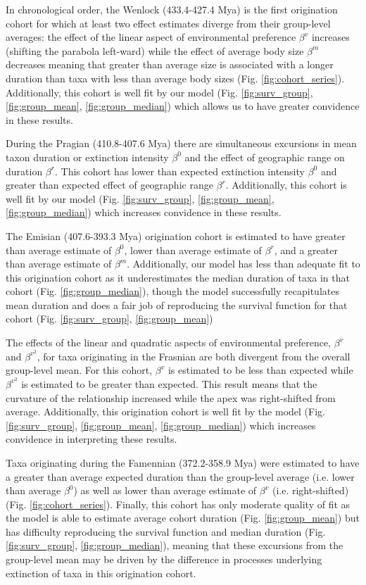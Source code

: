 \documentclass[11pt]{article}
\begin{document}
In chronological order, the Wenlock (433.4-427.4 Mya) is the first origination cohort for which at least two effect estimates diverge from their group-level averages: the effect of the linear aspect of environmental preference \(\beta^{v}\) increases (shifting the parabola left-ward) while the effect of average body size \(\beta^{m}\) decreases meaning that greater than average size is associated with a longer duration than taxa with less than average body sizes (Fig. \ref{fig:cohort_series}). Additionally, this cohort is well fit by our model (Fig. \ref{fig:surv_group}, \ref{fig:group_mean}, \ref{fig:group_median}) which allows us to have greater convidence in these results.

During the Pragian (410.8-407.6 Mya) there are simultaneous excursions in mean taxon duration or extinction intensity \(\beta^{0}\) and the effect of geographic range on duration \(\beta^{r}\). This cohort has lower than expected extinction intensity \(\beta^{0}\) and greater than expected effect of geographic range \(\beta^{r}\). Additionally, this cohort is well fit by our model (Fig. \ref{fig:surv_group}, \ref{fig:group_mean}, \ref{fig:group_median}) which increases convidence in these results.

The Emisian (407.6-393.3 Mya) origination cohort is estimated to have greater than average estimate of \(\beta^{0}\), lower than average estimate of \(\beta^{r}\), and a greater than average estimate of \(\beta^{m}\). Additionally, our model has less than adequate fit to this origination cohort as it underestimates the median duration of taxa in that cohort (Fig. \ref{fig:group_median}), though the model successfully recapitulates mean duration and does a fair job of reproducing the survival function for that cohort (Fig. \ref{fig:surv_group}, \ref{fig:group_mean})


The effects of the linear and quadratic aspects of environmental preference, \(\beta^{v}\) and \(\beta^{v^{2}}\), for taxa originating in the Frasnian are both divergent from the overall group-level mean. For this cohort, \(\beta^{v}\) is estimated to be less than expected while \(\beta^{v^{2}}\) is estimated to be greater than expected. This result means that the curvature of the relationship increased while the apex was right-shifted from average. Additionally, this origination cohort is well fit by the model (Fig. \ref{fig:surv_group}, \ref{fig:group_mean}, \ref{fig:group_median}) which increases convidence in interpreting these results.

Taxa originating during the Famennian (372.2-358.9 Mya) were estimated to have a greater than average expected duration than the group-level average (i.e. lower than average \(\beta^{0}\)) as well as lower than average estimate of \(\beta^{v}\) (i.e. right-shifted) (Fig. \ref{fig:cohort_series}). Finally, this cohort has only moderate quality of fit as the model is able to estimate average cohort duration (Fig. \ref{fig:group_mean}) but has difficulty reproducing the survival function and median duration (Fig. \ref{fig:surv_group}, \ref{fig:group_median}), meaning that these excursions from the group-level mean may be driven by the difference in processes underlying extinction of taxa in this origination cohort.
\end{document}
